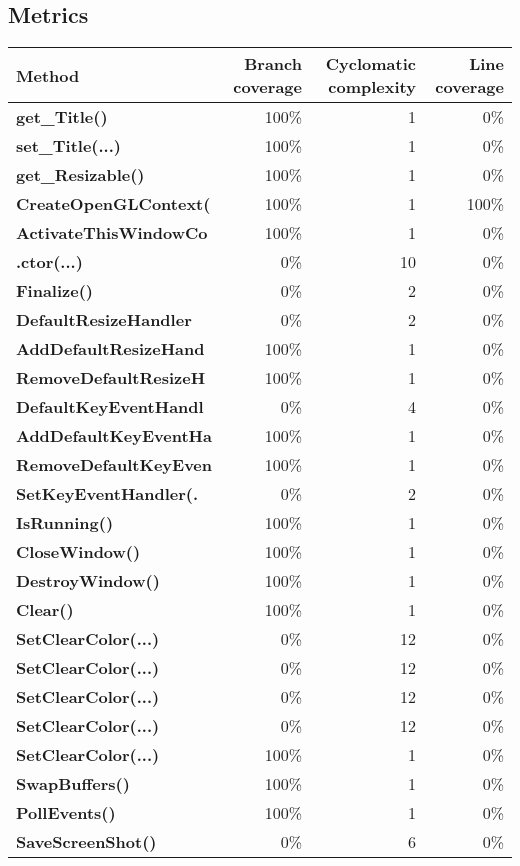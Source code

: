 \documentclass[a4paper,landscape,10pt]{article}
\begin{document}
\subsection{Metrics}
\begin{longtable}[l]{|l|r|r|r|}
\hline
\textbf{Method} & \textbf{Branch coverage} & \textbf{Cyclomatic complexity} & \textbf{Line coverage}\\
\hline
\textbf{get\_Title()} & 100\% & 1 & 0\%\\
\hline
\textbf{set\_Title(...)} & 100\% & 1 & 0\%\\
\hline
\textbf{get\_Resizable()} & 100\% & 1 & 0\%\\
\hline
\textbf{CreateOpenGLContext(} & 100\% & 1 & 100\%\\
\hline
\textbf{ActivateThisWindowCo} & 100\% & 1 & 0\%\\
\hline
\textbf{.ctor(...)} & 0\% & 10 & 0\%\\
\hline
\textbf{Finalize()} & 0\% & 2 & 0\%\\
\hline
\textbf{DefaultResizeHandler} & 0\% & 2 & 0\%\\
\hline
\textbf{AddDefaultResizeHand} & 100\% & 1 & 0\%\\
\hline
\textbf{RemoveDefaultResizeH} & 100\% & 1 & 0\%\\
\hline
\textbf{DefaultKeyEventHandl} & 0\% & 4 & 0\%\\
\hline
\textbf{AddDefaultKeyEventHa} & 100\% & 1 & 0\%\\
\hline
\textbf{RemoveDefaultKeyEven} & 100\% & 1 & 0\%\\
\hline
\textbf{SetKeyEventHandler(.} & 0\% & 2 & 0\%\\
\hline
\textbf{IsRunning()} & 100\% & 1 & 0\%\\
\hline
\textbf{CloseWindow()} & 100\% & 1 & 0\%\\
\hline
\textbf{DestroyWindow()} & 100\% & 1 & 0\%\\
\hline
\textbf{Clear()} & 100\% & 1 & 0\%\\
\hline
\textbf{SetClearColor(...)} & 0\% & 12 & 0\%\\
\hline
\textbf{SetClearColor(...)} & 0\% & 12 & 0\%\\
\hline
\textbf{SetClearColor(...)} & 0\% & 12 & 0\%\\
\hline
\textbf{SetClearColor(...)} & 0\% & 12 & 0\%\\
\hline
\textbf{SetClearColor(...)} & 100\% & 1 & 0\%\\
\hline
\textbf{SwapBuffers()} & 100\% & 1 & 0\%\\
\hline
\textbf{PollEvents()} & 100\% & 1 & 0\%\\
\hline
\textbf{SaveScreenShot()} & 0\% & 6 & 0\%\\
\hline
\end{longtable}
\end{document}
